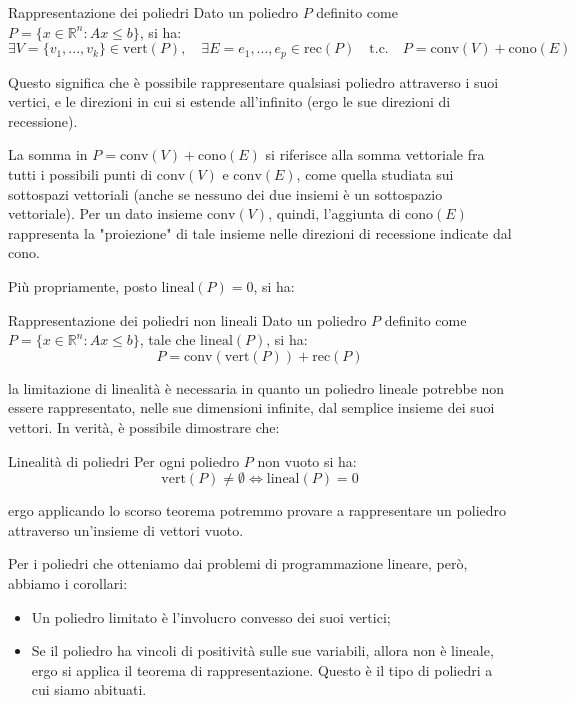 \documentclass[a4paper,11pt]{article}
\begin{document}
\begin{theorem}{Rappresentazione dei poliedri}
	Dato un poliedro $P$ definito come $P = \{ x \in \mathbb{R}^n : Ax \leq b \}$, si ha:
	$$
	\exists V = \{ v_1, ..., v_k \} \in \mathrm{vert}(P), \quad \exists E = {e_1, ..., e_p} \in \mathrm{rec}(P) \quad \text{t.c.} \quad P = \mathrm{conv}(V) + \mathrm{cono}(E)
	$$
\end{theorem}

Questo significa che è possibile rappresentare qualsiasi poliedro attraverso i suoi vertici, e le direzioni in cui si estende all'infinito (ergo le sue direzioni di recessione).

La somma in $P = \mathrm{conv}(V) + \mathrm{cono}(E)$ si riferisce alla somma vettoriale fra tutti i possibili punti di $\mathrm{conv}(V)$ e $\mathrm{conv}(E)$, come quella studiata sui sottospazi vettoriali (anche se nessuno dei due insiemi è un sottospazio vettoriale).
Per un dato insieme $\mathrm{conv}(V)$, quindi, l'aggiunta di $\mathrm{cono}(E)$ rappresenta la "proiezione" di tale insieme nelle direzioni di recessione indicate dal cono.

Più propriamente, posto $\mathrm{lineal}(P) = {0}$, si ha:

\begin{theorem}{Rappresentazione dei poliedri non lineali}
	Dato un poliedro $P$ definito come $P = \{ x \in \mathbb{R}^n : Ax \leq b \}$, tale che $\mathrm{lineal}(P)$, si ha:
	$$
	P = \mathrm{conv}(\mathrm{vert}(P)) + \mathrm{rec}(P)
	$$
\end{theorem}
la limitazione di linealità è necessaria in quanto un poliedro lineale potrebbe non essere rappresentato, nelle sue dimensioni infinite, dal semplice insieme dei suoi vettori.
In verità, è possibile dimostrare che:

\begin{theorem}{Linealità di poliedri}
	Per ogni poliedro $P$ non vuoto si ha:
	$$
		\mathrm{vert}(P) \neq \emptyset \Leftrightarrow \mathrm{lineal}(P) = {0}
	$$
\end{theorem}
ergo applicando lo scorso teorema potremmo provare a rappresentare un poliedro attraverso un'insieme di vettori vuoto.

Per i poliedri che otteniamo dai problemi di programmazione lineare, però, abbiamo i corollari:
\begin{itemize}
	\item Un poliedro limitato è l'involucro convesso dei suoi vertici;
	\item Se il poliedro ha vincoli di positività sulle sue variabili, allora non è lineale, ergo si applica il teorema di rappresentazione.
		Questo è il tipo di poliedri a cui siamo abituati.
\end{itemize}
\end{document}
